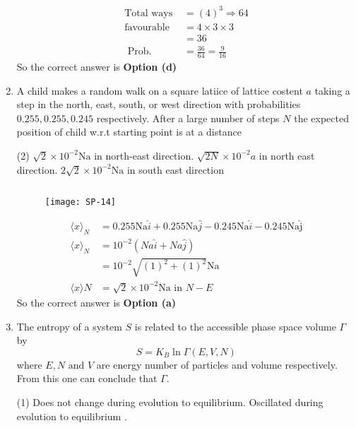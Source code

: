 \begin{enumerate}
	\begin{answer}
		\begin{align*}
		\text{Total ways }&=(4)^{3} \Rightarrow 64\\
		\text{favourable }&=4 \times 3 \times 3\\
		&=36\\
		\text { Prob. }&=\frac{36}{64}=\frac{9}{16}
		\end{align*}
		So the correct answer is \textbf{Option (d)}
	\end{answer}
	\item A child makes a random walk on a square latiice of lattice costent $a$ taking a step in the north, east, south, or west direction with probabilities $0.255,0.255,0.245$ respectively. After a large number of steps $N$ the expected position of child w.r.t starting point is at a distance
	\begin{tasks}(2)
		\task[\textbf{a.}]$\sqrt{2} \times 10^{-2} \mathrm{Na}$ in north-east direction.
		\task[\textbf{b.}]$\sqrt{2 N} \times 10^{-2} a$  in north east direction.
		\task[\textbf{c.}]$2 \sqrt{2} \times 10^{-2} \mathrm{Na}$ in south east direction
	\end{tasks}
	\begin{answer}$\left. \right. $
		\begin{figure}[H]
			\centering
			\texttt{[image: SP-14]}
		\end{figure}
		\begin{align*}
		\langle x\rangle_{N}&=0.255 \mathrm{Na}\hat{i}
		+0.255 \mathrm{Na} \hat{j}-0.245 \mathrm{Na} \hat{i}
		-0.245 \mathrm{Na\hat{j}}\\
		\langle x\rangle_{N}&=10^{-2}(Na \hat{i}+Na \hat { j })\\
		&=10^{-2} \sqrt{(1)^{2}+(1)^{2}} \mathrm{Na}\\
		\langle x\rangle N&=\sqrt{2} \times 10^{-2} \mathrm{Na} \text { in } N-E
		\end{align*}
		So the correct answer is \textbf{Option (a)}
	\end{answer}
	\item The entropy of a system $S$ is related to the accessible phase space volume $\Gamma$ by 
	$$S=K_{B} \ln \Gamma(E, V, N)$$
	where $E,N \text{ and }V$ are energy number of particles and volume respectively. From this one can conclude that $\Gamma$.
	\begin{tasks}(1)
		\task[\textbf{a.}]Does not change during evolution to equilibrium.
		\task[\textbf{b.}]Oscillated during evolution to equilibrium .

\end{tasks}
\end{enumerate}
